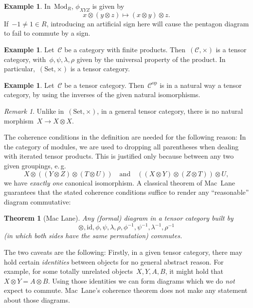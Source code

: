 \documentclass[a4paper,english,12pt]{scrartcl}
\theoremstyle{definition}
\newtheorem{ex}[defn]{Example}
\theoremstyle{plain}
\newtheorem{thm}[defn]{Theorem}
\theoremstyle{remark}
\newtheorem{rem}[defn]{Remark}
\newcommand{\C}{\mathcal{C}}
\newcommand{\id}{\mathrm{id}}
\newcommand{\op}{\mathrm{op}}
\renewcommand{\_}{\mathpunct{.}\,}
\newcommand{\?}{\,{:}\,}
\newcommand{\Mod}{\mathrm{Mod}}
\newcommand{\Set}{\mathrm{Set}}
\begin{document}
\begin{ex}In~$\Mod_R$, $\phi_{XYZ}$ is given by
\[ x \otimes (y \otimes z) \longmapsto (x \otimes y) \otimes z. \]
If~$-1 \neq 1 \in R$, introducing an artificial sign here will cause the pentagon diagram
to fail to commute by a sign.\end{ex}

\begin{ex}Let~$\C$ be a category with finite products. Then~$(\C,\times)$ is a
tensor category, with~$\phi, \psi, \lambda, \rho$ given by the universal
property of the product. In particular,~$(\Set,\times)$ is a tensor
category.\end{ex}

\begin{ex}Let~$\C$ be a tensor category. Then~$\C^\op$ is in a natural way a
tensor category, by using the inverses of the given natural
isomorphisms.\end{ex}

\begin{rem}Unlike in~$(\Set,\times)$, in a general tensor category, there is no
natural morphism~$X \to X \otimes X$.\end{rem}

The coherence conditions in the definition are needed for the following reason:
In the category of modules, we are used to dropping all parentheses when
dealing with iterated tensor products. This is justified only because between any
two given groupings, e.\,g.
\[ X \otimes ((Y \otimes Z) \otimes (T \otimes U)) \quad\text{and}\quad
  ((X \otimes Y) \otimes (Z \otimes T)) \otimes U, \]
we have \emph{exactly one} canonical isomorphism. A classical theorem of Mac~Lane
guarantees that the stated coherence conditions suffice to render any
``reasonable'' diagram commutative:

\begin{thm}[Mac Lane]Any (formal) diagram in a tensor category built
by \[
\otimes,\id,\phi,\psi,\lambda,\rho,\phi^{-1},\psi^{-1},\lambda^{-1},\rho^{-1}
\]
(in which both sides have the same permutation) commutes.\end{thm}

The two caveats are the following: Firstly, in a given tensor category, there
may hold certain \emph{identities} between objects for no general abstract
reason. For example, for some totally unrelated objects~$X,Y,A,B$, it might
hold that $X \otimes Y = A \otimes B$. Using those identities we can form
diagrams which we do \emph{not} expect to commute. Mac~Lane's coherence theorem
does not make any statement about those diagrams.
\end{document}
